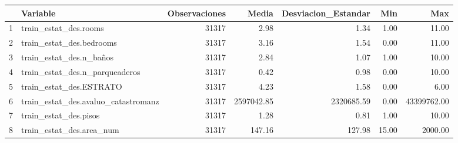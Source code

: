 \begin{table}[ht]
\centering
\begin{tabular}{rlrrrrr}
  \hline
 & Variable & Observaciones & Media & Desviacion\_Estandar & Min & Max \\ 
  \hline
1 & train\_estat\_des.rooms & 31317 & 2.98 & 1.34 & 1.00 & 11.00 \\ 
  2 & train\_estat\_des.bedrooms & 31317 & 3.16 & 1.54 & 0.00 & 11.00 \\ 
  3 & train\_estat\_des.n\_baños & 31317 & 2.84 & 1.07 & 1.00 & 10.00 \\ 
  4 & train\_estat\_des.n\_parqueaderos & 31317 & 0.42 & 0.98 & 0.00 & 10.00 \\ 
  5 & train\_estat\_des.ESTRATO & 31317 & 4.23 & 1.58 & 0.00 & 6.00 \\ 
  6 & train\_estat\_des.avaluo\_catastromanz & 31317 & 2597042.85 & 2320685.59 & 0.00 & 43399762.00 \\ 
  7 & train\_estat\_des.pisos & 31317 & 1.28 & 0.81 & 1.00 & 10.00 \\ 
  8 & train\_estat\_des.area\_num & 31317 & 147.16 & 127.98 & 15.00 & 2000.00 \\ 
   \hline
\end{tabular}
\end{table}

